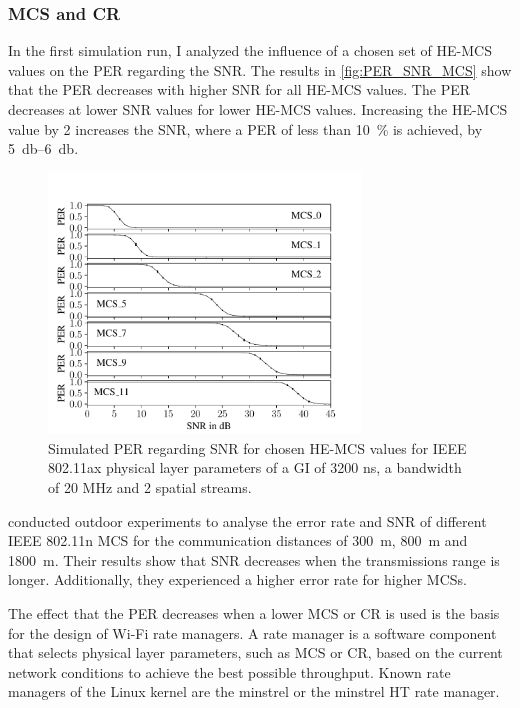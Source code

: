 \subsubsection*{\acf{MCS} and \acf{CR}}
In the first simulation run, I analyzed the influence of a chosen set of \ac{HE}-\ac{MCS} values on the \ac{PER} regarding the \ac{SNR}.
The results in \autoref{fig:PER_SNR_MCS} show that the \ac{PER} decreases with higher \ac{SNR} for all \ac{HE}-\ac{MCS} values. The
\ac{PER} decreases at lower \ac{SNR} values for lower \ac{HE}-\ac{MCS} values. Increasing the \ac{HE}-\ac{MCS} value by \num{2} increases the \ac{SNR}, where a \ac{PER} of less than
\SI{10}{\percent} is achieved, by \SIrange{5}{6}{\decibel}.
\begin{figure}[H]%
   \centering
   \includegraphics[width=0.74\textwidth]{figures/MCS_PER_to_SNR.pdf}
   \caption{Simulated PER regarding SNR for chosen \ac{HE}-\ac{MCS} values for IEEE 802.11ax physical layer parameters
         of a GI of 3200 ns, a bandwidth of 20 MHz and \num{2} spatial streams.}
   \label{fig:PER_SNR_MCS}%
\end{figure}
\textcite{paul_characterizing_2011} conducted outdoor experiments to analyse the error rate and \ac{SNR} of different IEEE 802.11n \ac{MCS} for the
communication distances of \SI{300}{\meter}, \SI{800}{\meter} and \SI{1800}{\meter}. Their results show that \ac{SNR} decreases when the transmissions range is longer.
Additionally, they experienced a higher error rate for higher \acp{MCS}.

The effect that the \ac{PER} decreases when a lower \ac{MCS} or \ac{CR} is used is the basis for the design of Wi-Fi rate managers.
A rate manager is a software component that selects physical layer parameters, such as \ac{MCS} or \ac{CR}, based on the current network conditions to
achieve the best possible throughput. Known rate managers of the Linux kernel are the minstrel or the minstrel HT rate manager.

